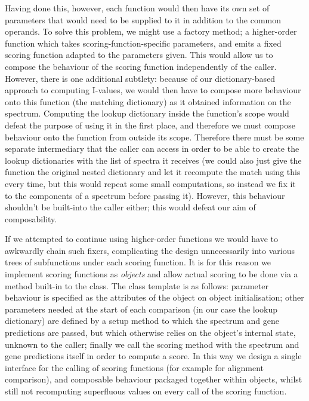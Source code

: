 \documentclass{l4proj}
\begin{document}
Having done this, however, each function would then have its own set of parameters that would need to be supplied to it in addition to the common operands. To solve this problem, we might use a factory method; a higher-order function which takes scoring-function-specific parameters, and emits a fixed scoring function adapted to the parameters given. This would allow us to compose the behaviour of the scoring function independently of the caller. However, there is one additional subtlety: because of our dictionary-based approach to computing I-values, we would then have to compose more behaviour onto this function (the matching dictionary) as it obtained information on the spectrum. Computing the lookup dictionary inside the function's scope would defeat the purpose of using it in the first place, and therefore we must compose behaviour onto the function from outside its scope. Therefore there must be some separate intermediary that the caller can access in order to be able to create the lookup dictionaries with the list of spectra it receives (we could also just give the function the original nested dictionary and let it recompute the match using this every time, but this would repeat some small computations, so instead we fix it to the components of a spectrum before passing it). However, this behaviour shouldn't be built-into the caller either; this would defeat our aim of composability. 

If we attempted to continue using higher-order functions we would have to awkwardly chain such fixers, complicating the design unnecessarily into various trees of subfunctions under each scoring function. It is for this reason we implement scoring functions as \textit{objects} and allow actual scoring to be done via a method built-in to the class. The class template is as follows: parameter behaviour is specified as the attributes of the object on object initialisation; other parameters needed at the start of each comparison (in our case the lookup dictionary) are defined by a setup method to which the spectrum and gene predictions are passed, but which otherwise relies on the object's internal state, unknown to the caller; finally we call the scoring method with the spectrum and gene predictions itself in order to compute a score. In this way we design a single interface for the calling of scoring functions (for example for alignment comparison), and composable behaviour packaged together within objects, whilst still not recomputing superfluous values on every call of the scoring function.
\end{document}

